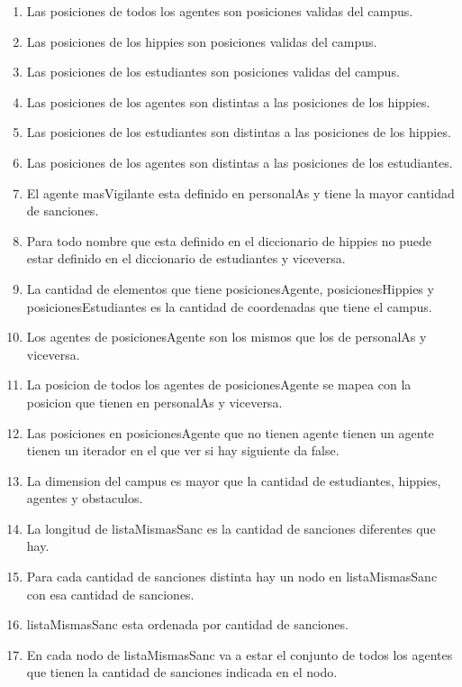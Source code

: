 \begin{enumerate}
	\item Las posiciones de todos los agentes son posiciones validas del campus.
	\item Las posiciones de los hippies son posiciones validas del campus.
	\item Las posiciones de los estudiantes son posiciones validas del campus.
	\item Las posiciones de los agentes son distintas a las posiciones de los hippies.
	\item Las posiciones de los estudiantes son distintas a las posiciones de los hippies.
	\item Las posiciones de los agentes son distintas a las posiciones de los estudiantes.
	\item El agente masVigilante esta definido en personalAs y tiene la mayor cantidad de sanciones.
	\item Para todo nombre que esta definido en el diccionario de hippies no puede estar definido en el diccionario de estudiantes y viceversa.
	\item La cantidad de elementos que tiene posicionesAgente, posicionesHippies y posicionesEstudiantes es la cantidad de coordenadas que tiene el campus.
	\item Los agentes de posicionesAgente son los mismos que los de personalAs y viceversa.
	\item La posicion de todos los agentes de posicionesAgente se mapea con la posicion que tienen en personalAs y viceversa.

	\item Las posiciones en posicionesAgente que no tienen agente tienen un agente tienen un iterador en el que ver si hay siguiente da false.
	
	\item La dimension del campus es mayor que la cantidad de estudiantes, hippies, agentes y obstaculos.
	\item La longitud de listaMismasSanc es la cantidad de sanciones diferentes que hay.
	\item Para cada cantidad de sanciones distinta hay un nodo en listaMismasSanc con esa cantidad de sanciones.
	\item listaMismasSanc esta ordenada por cantidad de sanciones.
	\item En cada nodo de listaMismasSanc va a estar el conjunto de todos los agentes que tienen la cantidad de sanciones indicada en el nodo.


\end{enumerate}

